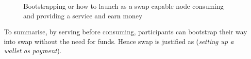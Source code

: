\begin{center}
\begin{figure}
\begin{center}
\end{center}
\caption{Bootstrapping or how to launch as a swap capable node consuming and providing a
service  and earn money}
\label{fig:bootstrapping}
\end{figure}
\end{center}


To summarise, by serving before consuming, participants can bootstrap their way into swap without the need for funds. Hence swap is justified as (\emph{setting up a wallet as payment}).
